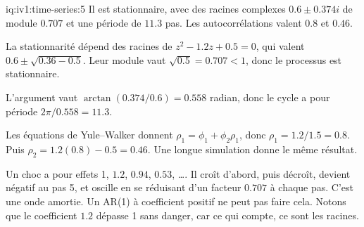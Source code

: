 \begin{solution}{iq:iv1:time-series:5}
Il est stationnaire, avec des racines complexes $0.6 \pm 0.374i$ de module $0.707$ et une période de $11.3$ pas. Les autocorrélations valent $0.8$ et $0.46$.

La stationnarité dépend des racines de $z^2 - 1.2z + 0.5 = 0$, qui valent $0.6 \pm \sqrt{0.36 - 0.5}$. Leur module vaut $\sqrt{0.5} = 0.707 < 1$, donc le processus est stationnaire.

L'argument vaut $\arctan(0.374/0.6) = 0.558$ radian, donc le cycle a pour période $2\pi/0.558 = 11.3$.

Les équations de Yule--Walker donnent $\rho_1 = \phi_1 + \phi_2\rho_1$, donc $\rho_1 = 1.2/1.5 = 0.8$. Puis $\rho_2 = 1.2(0.8) - 0.5 = 0.46$. Une longue simulation donne le même résultat.

Un choc a pour effets 1, $1.2$, $0.94$, $0.53$, \dots. Il croît d'abord, puis décroît, devient négatif au pas 5, et oscille en se réduisant d'un facteur $0.707$ à chaque pas. C'est une onde amortie. Un AR(1) à coefficient positif ne peut pas faire cela. Notons que le coefficient $1.2$ dépasse 1 sans danger, car ce qui compte, ce sont les racines.



\end{solution}

